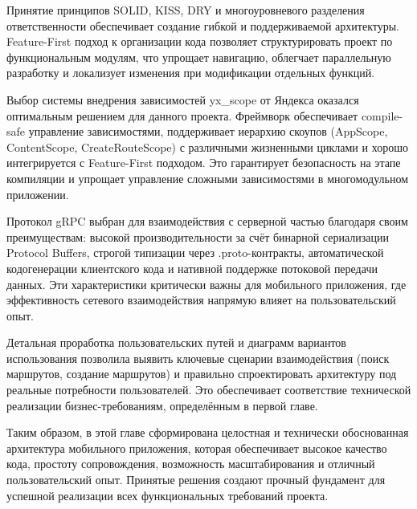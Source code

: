 Принятие принципов SOLID, KISS, DRY и многоуровневого разделения ответственности обеспечивает создание гибкой и поддерживаемой архитектуры. Feature-First подход к организации кода позволяет структурировать проект по функциональным модулям, что упрощает навигацию, облегчает параллельную разработку и локализует изменения при модификации отдельных функций.

Выбор системы внедрения зависимостей yx\_scope от Яндекса оказался оптимальным решением для данного проекта. Фреймворк обеспечивает compile-safe управление зависимостями, поддерживает иерархию скоупов (AppScope, ContentScope, CreateRouteScope) с различными жизненными циклами и хорошо интегрируется с Feature-First подходом. Это гарантирует безопасность на этапе компиляции и упрощает управление сложными зависимостями в многомодульном приложении.

Протокол gRPC выбран для взаимодействия с серверной частью благодаря своим преимуществам: высокой производительности за счёт бинарной сериализации Protocol Buffers, строгой типизации через .proto-контракты, автоматической кодогенерации клиентского кода и нативной поддержке потоковой передачи данных. Эти характеристики критически важны для мобильного приложения, где эффективность сетевого взаимодействия напрямую влияет на пользовательский опыт.

Детальная проработка пользовательских путей и диаграмм вариантов использования позволила выявить ключевые сценарии взаимодействия (поиск маршрутов, создание маршрутов) и правильно спроектировать архитектуру под реальные потребности пользователей. Это обеспечивает соответствие технической реализации бизнес-требованиям, определённым в первой главе.

Таким образом, в этой главе сформирована целостная и технически обоснованная архитектура мобильного приложения, которая обеспечивает высокое качество кода, простоту сопровождения, возможность масштабирования и отличный пользовательский опыт. Принятые решения создают прочный фундамент для успешной реализации всех функциональных требований проекта.





